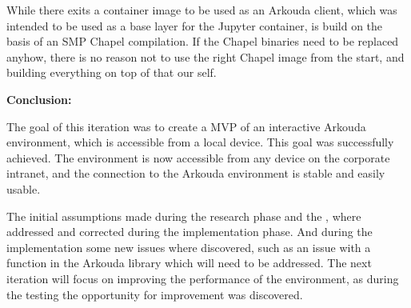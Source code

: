 While there exits a container image to be used as an Arkouda client, which was intended
to be used as a base layer for the Jupyter container,
is build on the basis of an \ac{SMP} Chapel compilation.
If the Chapel binaries need to be replaced anyhow,
there is no reason not to use the right Chapel image from the start,
and building everything on top of that our self.


\textbf{Conclusion:}

The goal of this iteration was to create a \ac{MVP} of an interactive Arkouda environment,
which is accessible from a local device. This goal was successfully achieved.
The environment is now accessible from any device on the corporate intranet,
and the connection to the Arkouda environment is stable and easily usable.

The initial assumptions made during the research phase and the ,
where addressed and corrected during the implementation phase.
And during the implementation some new issues where discovered,
such as an issue with a function in the Arkouda library which will need to be addressed.
The next iteration will focus on improving the performance of the environment,
as during the testing the opportunity for improvement was discovered.

\pagebreak
